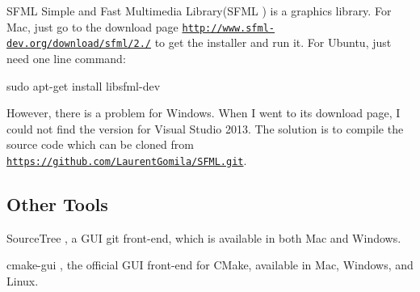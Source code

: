 \begin{DoxyParagraph}{S\+F\+M\+L}
Simple and Fast Multimedia Library(S\+F\+M\+L \cite{sfml}) is a graphics library. For Mac, just go to the download page \href{http://www.sfml-dev.org/download/sfml/2.1/}{\tt http\+://www.\+sfml-\/dev.\+org/download/sfml/2./} to get the installer and run it. For Ubuntu, just need one line command\+: 
\begin{DoxyCode}
sudo apt-\textcolor{keyword}{get} install libsfml-dev
\end{DoxyCode}
 However, there is a problem for Windows. When I went to its download page, I could not find the version for Visual Studio 2013. The solution is to compile the source code which can be cloned from \href{https://github.com/LaurentGomila/SFML.git}{\tt https\+://github.\+com/\+Laurent\+Gomila/\+S\+F\+M\+L.\+git}.
\end{DoxyParagraph}
\hypertarget{_conformance_SetupDevelopmentEnvironmentOtherTools}{}\subsection{Other Tools}\label{_conformance_SetupDevelopmentEnvironmentOtherTools}

\begin{DoxyItemize}
\item Source\+Tree \cite{sourcetree}, a G\+U\+I git front-\/end, which is available in both Mac and Windows.
\item cmake-\/gui \cite{cmakegui}, the official G\+U\+I front-\/end for C\+Make, available in Mac, Windows, and Linux. 
\end{DoxyItemize}